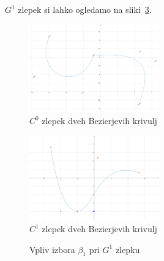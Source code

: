 \documentclass[isrm2, tisk]{fmfdelo}
\begin{document}
    $G^1$ zlepek si lahko ogledamo na sliki~\ref{fig:zlepek-g1}.
    \begin{figure}[h]
        \centering
        \includegraphics[width = 0.50\textwidth]{images/zlepek-c0}
        \caption{$C^0$ zlepek dveh Bezierjevih krivulj}
        \label{fig:zlepek-c0}
    \end{figure}
    \begin{figure}[h]
        \centering
        \includegraphics[width = 0.50\textwidth]{images/zlepek-c1}
        \caption{$C^1$ zlepek dveh Bezierjevih krivulj}
        \label{fig:zlepek-c1}
    \end{figure}
    \begin{figure}[h]
        \centering
        \qquad
        \caption{Vpliv izbora $\beta_1$ pri $G^1$ zlepku}
        \label{fig:zlepek-g1}
    \end{figure}
\end{document}
